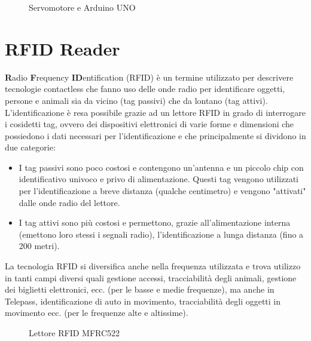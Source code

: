 \documentclass[12pt]{report}
\begin{document}
\begin{figure}
	\caption{Servomotore e Arduino UNO}
	\label{fig:servo_uno}
\end{figure}

%
\section{RFID Reader}
%

\textbf{R}adio \textbf{F}requency \textbf{ID}entification (RFID) è un termine utilizzato per descrivere tecnologie contactless che fanno uso delle onde radio per identificare oggetti, persone e animali sia da vicino (tag passivi) che da lontano (tag attivi). L'identificazione è resa possibile grazie ad un lettore RFID in grado di interrogare i cosidetti tag, ovvero dei dispositivi elettronici di varie forme e dimensioni che possiedono i dati necessari per l'identificazione e che principalmente si dividono in due categorie: 

\begin{itemize}
	\item I tag passivi sono poco costosi e contengono un'antenna e un piccolo chip con identificativo univoco e privo di alimentazione. Questi tag vengono utilizzati per l'identificazione a breve distanza (qualche centimetro) e vengono "attivati" dalle onde radio del lettore.
	\item I tag attivi sono più costosi e permettono, grazie all'alimentazione interna (emettono loro stessi i segnali radio), l'identificazione a lunga distanza (fino a 200 metri).
\end{itemize}

La tecnologia RFID si diversifica anche nella frequenza utilizzata e trova utilizzo in tanti campi diversi quali gestione accessi, tracciabilità degli animali, gestione dei biglietti elettronici, ecc$.$ (per le basse e medie frequenze), ma anche in Telepass, identificazione di auto in movimento, tracciabilità degli oggetti in movimento ecc. (per le frequenze alte e altissime).

\begin{figure}
	\caption{Lettore RFID MFRC522}
	\label{fig:mfrc522}
\end{figure}
\end{document}
